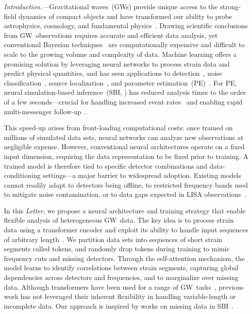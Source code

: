 \documentclass[aps,prl,twocolumn,nofootinbib,longbibliography,amsfonts,amssymb,amsmath,superscriptaddress]{revtex4-2}
\renewcommand{\sec}[1]{\emph{#1.---}}
\begin{document}
\sec{Introduction}Gravitational waves~(GWs) provide unique access to the strong-field dynamics of compact objects and have transformed our ability to probe astrophysics, cosmology, and fundamental physics~\cite{GBM:2017lvd, lvk_gw170817:2018, lvk_gwtc3_populations:2023, lvk_gwtc3_tests_gr:2025, lvk_gwtc3_expansion:2023, lvk_gwtc4_populations:2025,  lvk_spec_tests_gr_gw250114:2025, lvk_gwtc4_expansion:2025}. 
Drawing scientific conclusions from GW~observations requires accurate and efficient data analysis, yet conventional Bayesian techniques~\cite{ashton:2018,ashton_bilby:2021} are computationally expensive and difficult to scale to the growing volume and complexity of data. 
Machine learning offers a promising solution by leveraging neural networks to process strain data and predict physical quantities, and has seen applications to detection~\cite{gebhard:2019, Marx:2024wjt, Koloniari:2024kww}, noise classification~\cite{Razzano:2018fxb}, source localization~\cite{Chatterjee:2022ggk, Chatterjee:2022dik}, and parameter estimation~(PE)~\cite{Gabbard:2019rde, Chua:2019wwt, green_anf:2020, green_full_npe:2020, Delaunoy:2020zcu, dax_dingo:2021, dax_is:2022, Bhardwaj:2023xph, Chatterjee:2024pbj, dax_bns:2025, vanStraalen:2024xiq}. 
For PE, neural simulation-based inference~(SBI, \cite{cranmer_sbi:2020}) has reduced analysis times to the order of a few seconds---crucial for handling increased event rates~\cite{ligo_gwtc-21:2024,ligo_gwtc-3:2023} and enabling rapid multi-messenger follow-up~\cite{GBM:2017lvd}.

This speed-up arises from front-loading computational costs: once trained on millions of simulated data sets, neural networks can analyze new observations at negligible expense. 
However, conventional neural architectures operate on a fixed input dimension, requiring the data representation to be fixed prior to training. 
A trained model is therefore tied to specific detector combinations and data-conditioning settings---a major barrier to widespread adoption. 
Existing models cannot readily adapt to detectors being offline, to restricted frequency bands used to mitigate noise contamination, or to data gaps expected in LISA observations~\cite{burke:2025}.

In this \emph{Letter}, we propose a neural architecture and training strategy that enable flexible analysis of heterogeneous GW~data. 
The key idea is to process strain data using a transformer encoder and exploit its ability to handle input sequences of arbitrary length~\citep{vaswani:2017}. 
We partition data sets into sequences of short strain segments called tokens, and randomly drop tokens during training to mimic frequency cuts and missing detectors. 
Through the self-attention mechanism, the model learns to identify correlations between strain segments, capturing global dependencies across detectors and frequencies, and to marginalize over missing data. 
Although transformers have been used for a range of GW~tasks~\citep{jiang:2022, shi:2024, wang_waveformer:2024, chatterjee:2024, khalouei:2025, joshi:2025, papalini:2025}, previous work has not leveraged their inherent flexibility in handling variable-length or incomplete data. 
Our approach is inspired by works on missing data in SBI~\citep{shukla:2021, wang_missing_data:2024, gloeckler:2024, verma:2025}.
\end{document}
